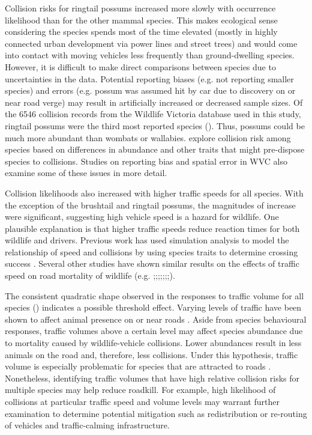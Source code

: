 Collision risks for ringtail possums increased more slowly with occurrence likelihood than for the other mammal species.  This makes ecological sense considering the species spends most of the time elevated (mostly in highly connected urban development via power lines and street trees) and would come into contact with moving vehicles less frequently than ground-dwelling species.  However, it is difficult to make direct comparisons between species due to uncertainties in the data.  Potential reporting biases (e.g. not reporting smaller species) and errors (e.g. possum was assumed hit by car due to discovery on or near road verge) may result in artificially increased or decreased sample sizes. Of the 6546 collision records from the Wildlife Victoria database used in this study, ringtail possums were the third most reported species ().  Thus, possums could be much more abundant than wombats or wallabies. \cite{gril14} explore collision risk among species based on differences in abundance and other traits that might pre-dispose species to collisions. Studies on reporting bias \citep{snow15} and spatial error \citep{guns09} in WVC also examine some of these issues in more detail.

Collision likelihoods also increased with higher traffic speeds for all species.  With the exception of the brushtail and ringtail possums, the magnitudes of increase were significant, suggesting high vehicle speed is a hazard for wildlife.  One plausible explanation is that higher traffic speeds reduce reaction times for both wildlife and drivers. Previous work has used simulation analysis to model the relationship of speed and collisions by using species traits to determine crossing success \citep{jaar06}. Several other studies have shown similar results on the effects of traffic speed on road mortality of wildlife (e.g. \cite{farm12};\cite{gkri13};\cite{lao11};\cite{ramp06a};\cite{seil05};\cite{seil06};\cite{sudh09};\cite{vanl09}).

The consistent quadratic shape observed in the responses to traffic volume for all species () indicates a possible threshold effect.  Varying levels of traffic have been shown to affect animal presence on or near roads \citep{jaeg05,rhod14}. Aside from species behavioural responses, traffic volumes above a certain level may affect species abundance due to mortality caused by wildlife-vehicle collisions. Lower abundances result in less animals on the road and, therefore, less collisions. Under this hypothesis, traffic volume is especially problematic for species that are attracted to roads \citep{form03}. Nonetheless, identifying traffic volumes that have high relative collision risks for multiple species may help reduce roadkill.  For example, high likelihood of collisions at particular traffic speed and volume levels may warrant further examination to determine potential mitigation such as redistribution or re-routing of vehicles and traffic-calming infrastructure.

